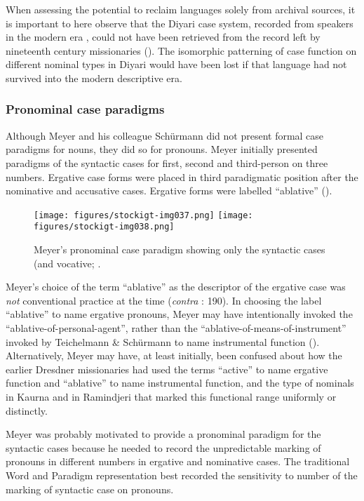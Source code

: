 \hspace*{-1.2pt}When assessing the potential to reclaim languages solely from archival sources, it is important to here observe that the Diyari case system, recorded from speakers in the modern era \citep{Austin1981}, could not have been retrieved from the record left by nineteenth century missionaries (). The isomorphic patterning of case function on different nominal types in Diyari would have been lost if that language had not survived into the modern descriptive era.

\subsubsection{Pronominal case paradigms}
\label{sec:key:6.1.2.3}\label{bkm:Ref74730717}

Although Meyer and his colleague Schürmann did not present formal case paradigms for nouns, they did so for pronouns. Meyer initially presented paradigms of the syntactic cases for first, second and third-person on three numbers. Ergative case forms were placed in third paradigmatic position after the nominative and accusative cases. Ergative forms were labelled “ablative” ().

\begin{figure}
\texttt{[image: figures/stockigt-img037.png]}
\texttt{[image: figures/stockigt-img038.png]}
\caption{Meyer’s pronominal case paradigm showing only the syntactic cases (and vocative; \citeyear[22--23]{meyer_vocabulary_1843}.}
\label{fig:key:96}
\end{figure}

Meyer’s choice of the term “ablative” as the descriptor of the ergative case was \textit{not} conventional practice at the time (\textit{contra} \citealt{lindner_ergative_2014}: 190). In choosing the label “ablative” to name ergative pronouns, Meyer may have intentionally invoked the ``ablative-of-personal-agent'', rather than the “ablative-of-means-of-instrument” invoked by Teichelmann \& Schürmann to name instrumental function (). Alternatively, Meyer may have, at least initially, been confused about how the earlier Dresdner missionaries had used the terms “active” to name ergative function and “ablative” to name instrumental function, and the type of nominals in Kaurna and in Ramindjeri that marked this functional range uniformly or distinctly.

Meyer was probably motivated to provide a pronominal paradigm for the syntactic cases because he needed to record the unpredictable marking of pronouns in different numbers in ergative and nominative cases. The traditional Word and Paradigm representation best recorded the sensitivity to number of the marking of syntactic case on pronouns.

